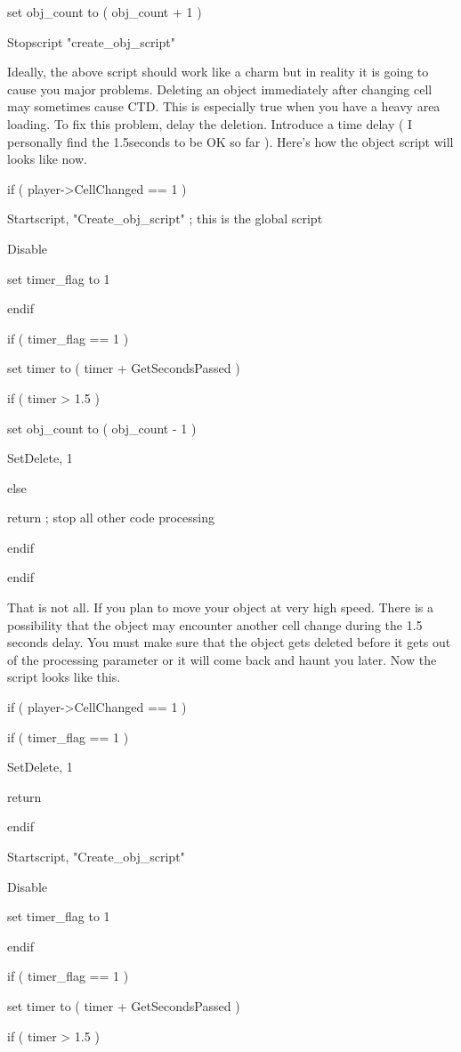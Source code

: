 \documentclass[
]{article}
\begin{document}
set obj\_count to ( obj\_count + 1 )

Stopscript "create\_obj\_script"

Ideally, the above script should work like a charm but in reality it is
going to cause you major problems. Deleting an object immediately after
changing cell may sometimes cause CTD. This is especially true when you
have a heavy area loading. To fix this problem, delay the deletion.
Introduce a time delay ( I personally find the 1.5seconds to be OK so
far ). Here's how the object script will looks like now.

if ( player-\textgreater CellChanged == 1 )

Startscript, "Create\_obj\_script" ; this is the global script

Disable

set timer\_flag to 1

endif

if ( timer\_flag == 1 )

set timer to ( timer + GetSecondsPassed )

if ( timer \textgreater{} 1.5 )

set obj\_count to ( obj\_count - 1 )

SetDelete, 1

else

return ; stop all other code processing

endif

endif

That is not all. If you plan to move your object at very high speed.
There is a possibility that the object may encounter another cell change
during the 1.5 seconds delay. You must make sure that the object gets
deleted before it gets out of the processing parameter or it will come
back and haunt you later. Now the script looks like this.

if ( player-\textgreater CellChanged == 1 )

if ( timer\_flag == 1 )

SetDelete, 1

return

endif

Startscript, "Create\_obj\_script"

Disable

set timer\_flag to 1

endif

if ( timer\_flag == 1 )

set timer to ( timer + GetSecondsPassed )

if ( timer \textgreater{} 1.5 )
\end{document}
